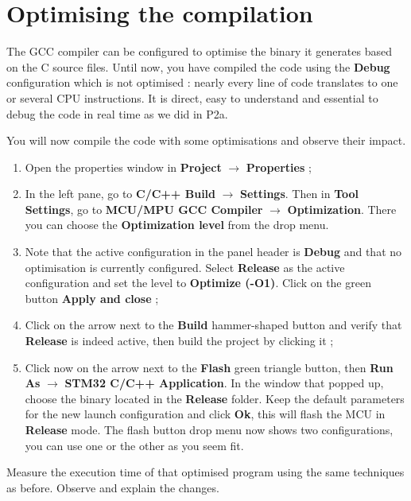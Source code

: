 \section{Optimising the compilation}

The GCC compiler can be configured to optimise the binary it generates based on the C source files. Until now, you have compiled the code using the \textbf{Debug} configuration which is not optimised : nearly every line of code translates to one or several CPU instructions. It is direct, easy to understand and essential to debug the code in real time as we did in P2a.

You will now compile the code with some optimisations and observe their impact.
\begin{enumerate}
	\item Open the properties window in \textbf{Project} $\rightarrow$ \textbf{Properties} ; 
	\item In the left pane, go to \textbf{C/C++ Build} $\rightarrow$ \textbf{Settings}. Then in \textbf{Tool Settings}, go to \textbf{MCU/MPU GCC Compiler} $\rightarrow$ \textbf{Optimization}. There you can choose the \textbf{Optimization level} from the drop menu.
	\item Note that the active configuration in the panel header is \textbf{Debug} and that no optimisation is currently configured. Select \textbf{Release} as the active configuration and set the level to \textbf{Optimize (-O1)}. Click on the green button \textbf{Apply and close} ;
	\item Click on the arrow next to the \textbf{Build} hammer-shaped button and verify that \textbf{Release} is indeed active, then build the project by clicking it ;
	\item Click now on the arrow next to the \textbf{Flash} green triangle button, then \textbf{Run As} $\rightarrow$ \textbf{STM32 C/C++ Application}. In the window that popped up, choose the binary located in the \textbf{Release} folder. Keep the default parameters for the new launch configuration and click \textbf{Ok}, this will flash the MCU in \textbf{Release} mode. The flash button drop menu now shows two configurations, you can use one or the other as you seem fit.
\end{enumerate}

Measure the execution time of that optimised program using the same techniques as before. Observe and explain the changes.


